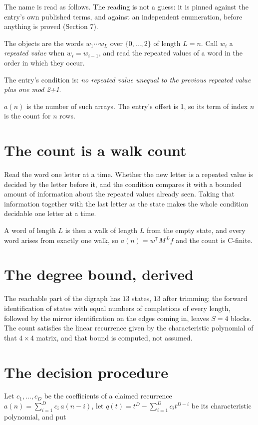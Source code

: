 \documentclass[11pt]{article}
\theoremstyle{definition}
\begin{document}
The name is read as follows. The reading is not a guess: it is pinned against the entry's own published terms, and against an independent enumeration, before anything is proved (Section 7).

The objects are the words $w_1\cdots w_L$ over $\{0,\dots,2\}$ of length $L = n$. Call $w_i$ a {\itshape repeated value} when $w_i = w_{i-1}$, and read the repeated values of a word in the order in which they occur.

The entry's condition is: {\itshape no repeated value unequal to the previous repeated value plus one mod 2+1}.

$a(n)$ is the number of such arrays. The entry's offset is 1, so its term of index $n$ is the count for $n$ rows.

\section{The count is a walk count}

Read the word one letter at a time. Whether the new letter is a repeated value is decided by the letter before it, and the condition compares it with a bounded amount of information about the repeated values already seen. Taking that information together with the last letter as the state makes the whole condition decidable one letter at a time.

A word of length $L$ is then a walk of length $L$ from the empty state, and every word arises from exactly one walk, so $a(n) = w^{\mathsf T}M^{\,L}f$ and the count is C-finite.

\section{The degree bound, derived}

The reachable part of the digraph has $13$ states, $13$ after trimming; the forward identification of states with equal numbers of completions of every length, followed by the mirror identification on the edges coming in, leaves $S = 4$ blocks. The count satisfies the linear recurrence given by the characteristic polynomial of that $4\times4$ matrix, and that bound is computed, not assumed.

\section{The decision procedure}

Let $c_1,\dots,c_D$ be the coefficients of a claimed recurrence $a(n) = \sum_{i=1}^{D} c_i\,a(n-i)$, let $q(t) = t^{D} - \sum_{i=1}^{D} c_i t^{D-i}$ be its characteristic polynomial, and put
\end{document}
